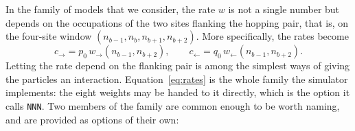 \documentclass[11pt]{article}
\begin{document}
In the family of models that we consider, the rate $w$ is not a single number but depends on the occupations of the two sites flanking the hopping pair, that is, on the four-site window $(n_{b-1}, n_b, n_{b+1}, n_{b+2})$. More specifically, the rates become
\begin{equation}
    c_\rightarrow = p_0 \, w_\rightarrow(n_{b-1},n_{b+2}), \qquad
    c_\leftarrow = q_0 \, w_\leftarrow(n_{b-1},n_{b+2}).
    \label{eq:rates}
\end{equation}
Letting the rate depend on the flanking pair is among the simplest ways of giving
the particles an interaction. Equation~\ref{eq:rates} is the whole family the
simulator implements: the eight weights may be handed to it directly, which is
the option it calls \texttt{NNN}. Two members of the family are common enough
to be worth naming, and are provided as options of their own:
\end{document}
